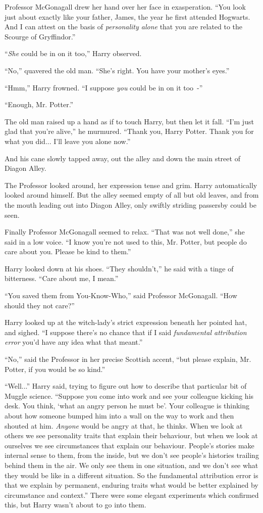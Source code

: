 Professor McGonagall drew her hand over her face in exasperation. ``You look just about exactly like your father, James, the year he first attended Hogwarts. And I can attest on the basis of \emph{personality alone} that you are related to the Scourge of Gryffindor.''

``\emph{She} could be in on it too,'' Harry observed.

``No,'' quavered the old man. ``She's right. You have your mother's eyes.''

``Hmm,'' Harry frowned. ``I suppose \emph{you} could be in on it too~-''

``Enough, Mr. Potter.''

The old man raised up a hand as if to touch Harry, but then let it fall. ``I'm just glad that you're alive,'' he murmured. ``Thank you, Harry Potter. Thank you for what you did... I'll leave you alone now.''

And his cane slowly tapped away, out the alley and down the main street of Diagon Alley.

The Professor looked around, her expression tense and grim. Harry automatically looked around himself. But the alley seemed empty of all but old leaves, and from the mouth leading out into Diagon Alley, only swiftly striding passersby could be seen.

Finally Professor McGonagall seemed to relax. ``That was not well done,'' she said in a low voice. ``I know you're not used to this, Mr. Potter, but people do care about you. Please be kind to them.''

Harry looked down at his shoes. ``They shouldn't,'' he said with a tinge of bitterness. ``Care about me, I mean.''

``You saved them from You-Know-Who,'' said Professor McGonagall. ``How should they not care?''

Harry looked up at the witch-lady's strict expression beneath her pointed hat, and sighed. ``I suppose there's no chance that if I said \emph{fundamental attribution error} you'd have any idea what that meant.''

``No,'' said the Professor in her precise Scottish accent, ``but please explain, Mr. Potter, if you would be so kind.''

``Well...'' Harry said, trying to figure out how to describe that particular bit of Muggle science. ``Suppose you come into work and see your colleague kicking his desk. You think, `what an angry person he must be'. Your colleague is thinking about how someone bumped him into a wall on the way to work and then shouted at him. \emph{Anyone} would be angry at that, he thinks. When we look at others we see personality traits that explain their behaviour, but when we look at ourselves we see circumstances that explain our behaviour. People's stories make internal sense to them, from the inside, but we don't see people's histories trailing behind them in the air. We only see them in one situation, and we don't see what they would be like in a different situation. So the fundamental attribution error is that we explain by permanent, enduring traits what would be better explained by circumstance and context.'' There were some elegant experiments which confirmed this, but Harry wasn't about to go into them.

